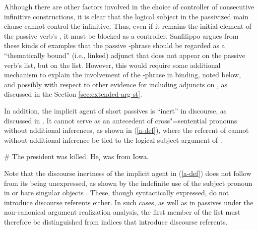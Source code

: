 \documentclass[output=paper
                ,modfonts
                ,nonflat
	        ,collection
	        ,collectionchapter
	        ,collectiontoclongg
 	        ,biblatex
                ,babelshorthands
                ,newtxmath
                ,draftmode
                ,colorlinks, citecolor=brown
]{./langsci/langscibook}
\begin{document}
Although there are other factors involved in the choice of controller of consecutive  infinitive constructions, it is clear that the logical subject in the passivized main clause cannot control the infinitive.
Thus, even if it remains the initial element of the passive verb's \argst, it must be blocked as a controller.
Sanfilippo argues from these kinds of examples that the passive -phrase should be regarded as a ``thematically bound'' (i.e., linked) adjunct that does
not appear on the passive verb's \argst list, but on the  list.
However, this would require some additional mechanism to explain the involvement of the -phrase in binding, noted below, and possibly with respect to other evidence for including adjuncts on \argst, as discussed in the Section \ref{sec:extended-arg-st}.

In addition, the implicit agent of short passives is ``inert'' in discourse, as discussed in \citet{KoenigandMauner1999}.
It cannot serve as an antecedent of cross"=sentential pronouns without additional inferences, as shown in (\ref{a-def}), where the referent of  cannot without additional inference be tied to the logical subject argument of .

\begin{exe}
\ex\label{a-def}
\# The president was killed. He$_{i}$ was from Iowa.
\end{exe}

Note that the discourse inertness of the implicit agent in (\ref{a-def}) does not follow from its being unexpressed, as shown by the indefinite use of the subject pronoun  in  \citep[241--244]{Koenig1998c} or  bare singular objects \cite[89--108]{FarkasandDeSwart2003}.
These, though syntactically expressed, do not introduce discourse referents either.
In such cases, as well as in passives under the non-canonical argument realization analysis, the first member of the \argst list must therefore be distinguished from indices that introduce discourse referents.
\end{document}
